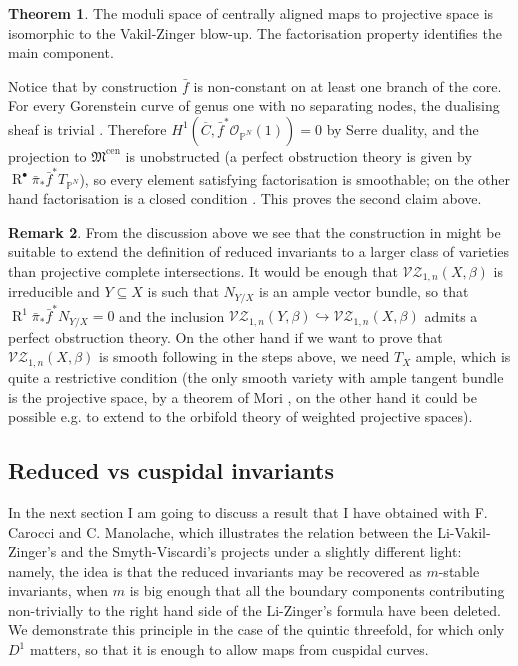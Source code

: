\documentclass[11pt]{amsart}
\newcommand{\VZ}[3]{\mathcal{V\!Z}_{1,#1}(#2,#3)}
\newcommand{\PP}{\mathbb P}
\newcommand{\OO}{\mathcal{O}}
\newcommand{\MM}{\mathfrak M}
\newcommand{\R}{\operatorname{R}^{\bullet}}
\theoremstyle{definition}
\newtheorem{thm}{Theorem}[section]
\theoremstyle{definition}
\newtheorem{rmk}[thm]{Remark}
\begin{document}
\begin{thm}\cite[Theorems 4.6.3.2 and 4.5.1]{RSPW}
 The moduli space of centrally aligned maps to projective space is isomorphic to the Vakil-Zinger blow-up. The factorisation property identifies the main component.
\end{thm}
Notice that by construction $\bar{f}$ is non-constant on at least one branch of the core. For every Gorenstein curve of genus one with no separating nodes, the dualising sheaf is trivial \cite[Lemma 3.3]{SMY1}. Therefore $H^1(\overline{C},\bar{f}^*\OO_{\PP^N}(1))=0$ by Serre duality, and the projection to $\MM^{\mathrm{cen}}$ is unobstructed (a perfect obstruction theory is given by $\R\bar{\pi}_*\bar{f}^*T_{\PP^N}$), so every element satisfying factorisation is smoothable; on the other hand factorisation is a closed condition \cite[Theorem 4.3]{RSPW}. This proves the second claim above.

\begin{rmk}
 From the discussion above we see that the construction in \cite{RSPW} might be suitable to extend the definition of reduced invariants to a larger class of varieties than projective complete intersections. It would be enough that $\VZ{n}{X}{\beta}$ is irreducible and $Y\subseteq X$ is such that $N_{Y/X}$ is an ample vector bundle, so that $\operatorname R^1\bar{\pi}_*\bar{f}^*N_{Y/X}=0$ and the inclusion $\VZ{n}{Y}{\beta}\hookrightarrow\VZ{n}{X}{\beta}$ admits a perfect obstruction theory. On the other hand if we want to prove that $\VZ{n}{X}{\beta}$ is smooth following in the steps above, we need $T_X$ ample, which is quite a restrictive condition (the only smooth variety with ample tangent bundle is the projective space, by a theorem of Mori \cite{Mori}, on the other hand it could be possible e.g. to extend to the orbifold theory of weighted projective spaces).
\end{rmk}
\subsection{Reduced vs cuspidal invariants} In the next section I am going to discuss a result that I have obtained with F. Carocci and C. Manolache, which illustrates the relation between the Li-Vakil-Zinger's and the Smyth-Viscardi's projects under a slightly different light: namely, the idea is that the reduced invariants may be recovered as $m$-stable invariants, when $m$ is big enough that all the boundary components contributing non-trivially to the right hand side of the Li-Zinger's formula have been deleted. We demonstrate this principle in the case of the quintic threefold, for which only $D^1$ matters, so that it is enough to allow maps from cuspidal curves.
\end{document}
